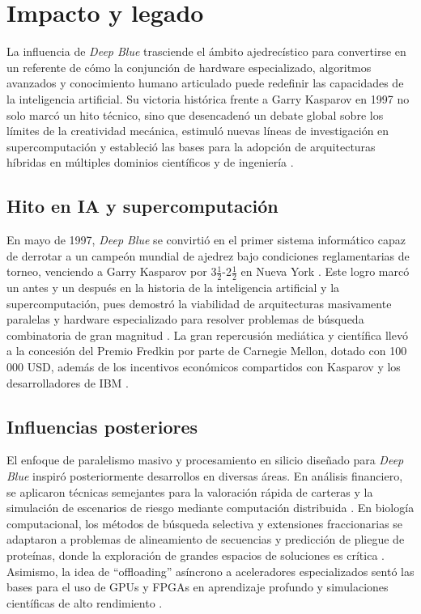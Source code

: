 \documentclass[a4paper, 12pt]{article}
\begin{document}
\section{Impacto y legado}

La influencia de \textit{Deep Blue} trasciende el ámbito 
ajedrecístico para convertirse en un referente de cómo la 
conjunción de hardware especializado, algoritmos avanzados y 
conocimiento humano articulado puede redefinir las capacidades 
de la inteligencia artificial. Su victoria histórica frente a 
Garry Kasparov en 1997 no solo marcó un hito técnico, sino que 
desencadenó un debate global sobre los límites de la creatividad 
mecánica, estimuló nuevas líneas de investigación en 
supercomputación y estableció las bases para la adopción de 
arquitecturas híbridas en múltiples dominios científicos y de 
ingeniería \cite{wired1997,wikideepblue}.


\subsection{Hito en IA y supercomputación}

En mayo de 1997, \textit{Deep Blue} se convirtió en el primer 
sistema informático capaz de derrotar a un campeón mundial de 
ajedrez bajo condiciones reglamentarias de torneo, venciendo a 
Garry Kasparov por 3\(\frac{1}{2}\)-2\(\frac{1}{2}\) en 
Nueva York \cite{wired1997,wikideepblue}. Este logro 
marcó un antes y un después en la historia de la inteligencia 
artificial y la supercomputación, pues demostró la viabilidad 
de arquitecturas masivamente paralelas y hardware especializado 
para resolver problemas de búsqueda combinatoria de gran 
magnitud \cite{wired1997}. La gran repercusión mediática y 
científica llevó a la concesión del Premio Fredkin por parte 
de Carnegie Mellon, dotado con 100 000 USD, además de los 
incentivos económicos compartidos con Kasparov y los 
desarrolladores de IBM \cite{wikideepblue,time2013}.  

\subsection{Influencias posteriores}

El enfoque de paralelismo masivo y procesamiento en silicio 
diseñado para \textit{Deep Blue} inspiró posteriormente 
desarrollos en diversas áreas. En análisis financiero, se 
aplicaron técnicas semejantes para la valoración rápida de 
carteras y la simulación de escenarios de riesgo mediante 
computación distribuida \cite{wired2015}. En biología 
computacional, los métodos de búsqueda selectiva y extensiones 
fraccionarias se adaptaron a problemas de alineamiento de 
secuencias y predicción de pliegue de proteínas, donde la 
exploración de grandes espacios de soluciones es crítica 
\cite{newyorker2006}. Asimismo, la idea de “offloading” 
asíncrono a aceleradores especializados sentó las bases para el 
uso de GPUs y FPGAs en aprendizaje profundo y simulaciones 
científicas de alto rendimiento \cite{newyorker2006}.  
\end{document}

